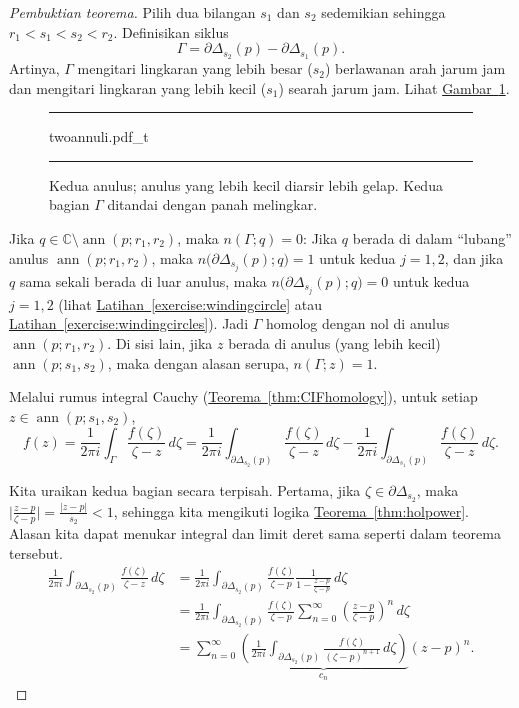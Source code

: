 \documentclass[12pt,openany]{book}
\newcommand{\ann}{\operatorname{ann}}
\newcommand{\sabs}[1]{\lvert {#1} \rvert}
\newcommand{\babs}[1]{\bigl\lvert {#1} \bigr\rvert}
\newcommand{\C}{{\mathbb{C}}}
\newcommand{\myquote}[1]{``#1''}
\theoremstyle{plain}
\theoremstyle{remark}
\theoremstyle{definition}
\newenvironment{myfig}{%
\begin{figure}[h!t]
\noindent\rule{\textwidth}{0.5pt}\vspace{12pt}\par\centering}%
{\par\noindent\rule{\textwidth}{0.5pt}
\end{figure}}
\theoremstyle{exercise}
\theoremstyle{example}
\newcommand{\figureref}[1]{\hyperref[#1]{Gambar~\ref*{#1}}}
\newcommand{\exerciseref}[1]{\hyperref[#1]{Latihan~\ref*{#1}}}
\newcommand{\thmref}[1]{\hyperref[#1]{Teorema~\ref*{#1}}}
\begin{document}
\begin{proof}[Pembuktian teorema]
Pilih dua bilangan $s_1$ dan $s_2$ sedemikian sehingga $r_1 < s_1 < s_2 < r_2$.
Definisikan siklus
\begin{equation*}
\Gamma = \partial \Delta_{s_2}(p) - \partial \Delta_{s_1}(p) .
\end{equation*}
Artinya, $\Gamma$ mengitari lingkaran yang lebih besar ($s_2$) berlawanan arah jarum jam dan
mengitari lingkaran yang lebih kecil ($s_1$) searah jarum jam.
Lihat \figureref{fig:twoannuli}.

\begin{myfig}
{twoannuli.pdf_t}
\caption{Kedua anulus; anulus yang lebih kecil diarsir lebih gelap. Kedua
bagian $\Gamma$ ditandai dengan panah melingkar.\label{fig:twoannuli}}
\end{myfig}

Jika $q \in \C \setminus \ann(p;r_1,r_2)$, maka $n(\Gamma;q) = 0$:
Jika $q$ berada di dalam \myquote{lubang} anulus $\ann(p;r_1,r_2)$, maka
$n\bigl(\partial \Delta_{s_j}(p);q\bigr) = 1$ untuk kedua $j=1,2$, dan 
jika $q$ sama sekali berada di luar anulus, maka
$n\bigl(\partial \Delta_{s_j}(p);q\bigr) = 0$ untuk kedua $j=1,2$ 
(lihat \exerciseref{exercise:windingcircle} atau
\exerciseref{exercise:windingcircles}).
Jadi $\Gamma$ homolog dengan nol di anulus $\ann(p;r_1,r_2)$.
Di sisi lain, jika $z$ berada di anulus (yang lebih kecil) $\ann(p;s_1,s_2)$,
maka dengan alasan serupa, $n(\Gamma;z) = 1$.

Melalui rumus integral Cauchy (\thmref{thm:CIFhomology}), untuk setiap $z \in \ann(p;s_1,s_2)$,
\begin{equation*}
f(z) = 
\frac{1}{2\pi i}
\int_{\Gamma} \frac{f(\zeta)}{\zeta-z} \, d\zeta 
=
\frac{1}{2\pi i}
\int_{\partial \Delta_{s_2}(p)} \frac{f(\zeta)}{\zeta-z} \, d\zeta 
-
\frac{1}{2\pi i}
\int_{\partial \Delta_{s_1}(p)} \frac{f(\zeta)}{\zeta-z} \, d\zeta  .
\end{equation*}

Kita uraikan kedua bagian secara terpisah. Pertama,
jika $\zeta \in \partial \Delta_{s_2}$, maka
$\babs{\frac{z-p}{\zeta-p}} = \frac{\sabs{z-p}}{s_2} < 1$, sehingga
kita mengikuti logika \thmref{thm:holpower}. Alasan kita dapat
menukar integral dan limit deret sama seperti dalam teorema tersebut.
\begin{equation*}
\begin{split}
\frac{1}{2\pi i}
\int_{\partial \Delta_{s_2}(p)} \frac{f(\zeta)}{\zeta-z} \, d\zeta 
& =
\frac{1}{2\pi i}
\int_{\partial \Delta_{s_2}(p)} \frac{f(\zeta)}{\zeta-p}
\frac{1}{1-\frac{z-p}{\zeta-p}} \, d\zeta
\\
& =
\frac{1}{2\pi i}
\int_{\partial \Delta_{s_2}(p)} \frac{f(\zeta)}{\zeta-p}
\sum_{n=0}^\infty
{\left(\frac{z-p}{\zeta-p}\right)}^n \, d\zeta
\\
& =
\sum_{n=0}^\infty
\underbrace{
\left(
\frac{1}{2\pi i}
\int_{\partial \Delta_{s_2}(p)} \frac{f(\zeta)}{{(\zeta-p)}^{n+1}}
 \, d\zeta
\right)
}_{c_n}
{(z-p)}^n .
\end{split}
\end{equation*}


\end{proof}
\end{document}
